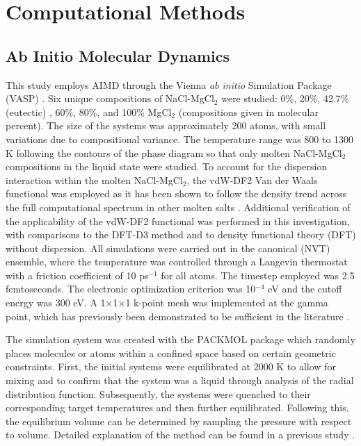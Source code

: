 \documentclass[review]{elsarticle}
\begin{document}
\section{Computational Methods}

\subsection{Ab Initio Molecular Dynamics}
This study employs AIMD through the Vienna \textit{ab initio} Simulation Package (VASP) \cite{Kresse1993,Kresse1996,Kresse1996a}. Six unique compositions of NaCl-MgCl$_{2}$ were studied: 0\%, 20\%, 42.7\% (eutectic) \cite{FTsalt}, 60\%, 80\%, and 100\% MgCl$_{2}$ (compositions given in molecular percent). The size of the systems was approximately 200 atoms, with small variations due to compositional variance. The temperature range was 800 to 1300 K following the contours of the phase diagram \cite{FTsalt} so that only molten NaCl-MgCl$_{2}$ compositions in the liquid state were studied. To account for the dispersion interaction within the molten NaCl-MgCl$_{2}$, the vdW-DF2 Van der Waals functional \cite{Dion2004} was employed as it has been shown to follow the density trend across the full computational spectrum in other molten salts \cite{Duemmler2021}. Additional verification of the applicability of the vdW-DF2 functional was performed in this investigation, with comparisons to the DFT-D3 \cite{grimm2010} method and to density functional theory (DFT) without dispersion. All simulations were carried out in the canonical (NVT) ensemble, where the temperature was controlled through a Langevin thermostat with a friction coefficient of 10 ps$^{-1}$ for all atoms. The timestep employed was 2.5 femtoseconds. The electronic optimization criterion was 10$^{-4}$ eV and the cutoff energy was 300 eV. A 1$\times$1$\times$1 k-point mesh was implemented at the gamma point, which has previously been demonstrated to be sufficient in the literature \cite{Bengston2014,Song2017}.

The simulation system was created with the PACKMOL package \cite{martinez2009} which randomly places molecules or atoms within a confined space based on certain geometric constraints. First, the initial systems were equilibrated at 2000 K to allow for mixing and to confirm that the system was a liquid through analysis of the radial distribution function. Subsequently, the systems were quenched to their corresponding target temperatures and then further equilibrated. Following this, the equilibrium volume can be determined by sampling the pressure with respect to volume. Detailed explanation of the method can be found in a previous study \cite{Duemmler2021}. 
\end{document}
